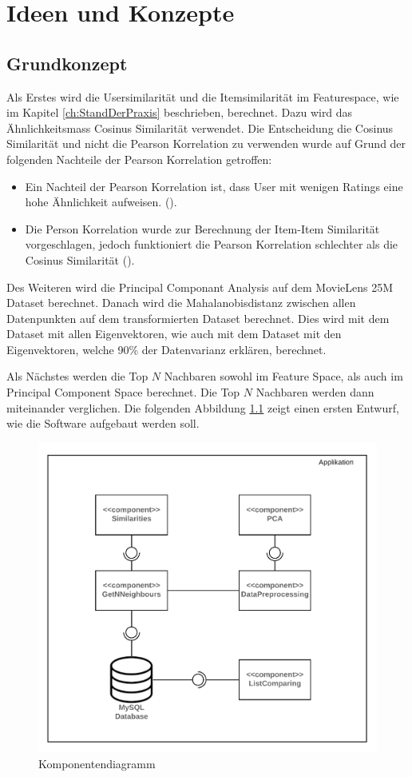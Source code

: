 \chapter{Ideen und Konzepte}
\section{Grundkonzept}
 Als Erstes wird die Usersimilarität und die Itemsimilarität im Featurespace, wie im Kapitel \ref{ch:StandDerPraxis}  beschrieben, berechnet. Dazu wird das Ähnlichkeitsmass Cosinus Similarität verwendet. Die Entscheidung die Cosinus Similarität und nicht die Pearson Korrelation zu verwenden wurde auf Grund der folgenden Nachteile der Pearson Korrelation getroffen:
\begin{itemize}
    \item Ein Nachteil der Pearson Korrelation ist, dass User mit wenigen Ratings eine hohe Ähnlichkeit aufweisen. (\cite{Ekstrand2011}).
    \item Die Person Korrelation wurde zur Berechnung der Item-Item Similarität vorgeschlagen, jedoch funktioniert die Pearson Korrelation schlechter als die Cosinus Similarität (\cite{10.1145/371920.372071}).
    
    
\end{itemize}

Des Weiteren wird die Principal Componant Analysis auf dem MovieLens 25M Dataset berechnet. Danach wird die Mahalanobisdistanz zwischen allen Datenpunkten auf dem transformierten Dataset berechnet. Dies wird mit dem Dataset mit allen Eigenvektoren, wie auch mit dem Dataset mit den Eigenvektoren, welche 90\% der Datenvarianz erklären, berechnet.

Als Nächstes werden die Top $N$ Nachbaren sowohl im Feature Space, als auch im Principal Component Space berechnet. Die Top $N$ Nachbaren werden dann miteinander verglichen. Die folgenden Abbildung \ref{fig:Komponentendiagramm} zeigt einen ersten Entwurf, wie die Software aufgebaut werden soll.

\begin{figure}[ht]
	\centering
	\includegraphics[keepaspectratio,width=0.66\linewidth]{img/Software Architektur BA.png}
	\caption{Komponentendiagramm}
	\label{fig:Komponentendiagramm}
\end{figure}

